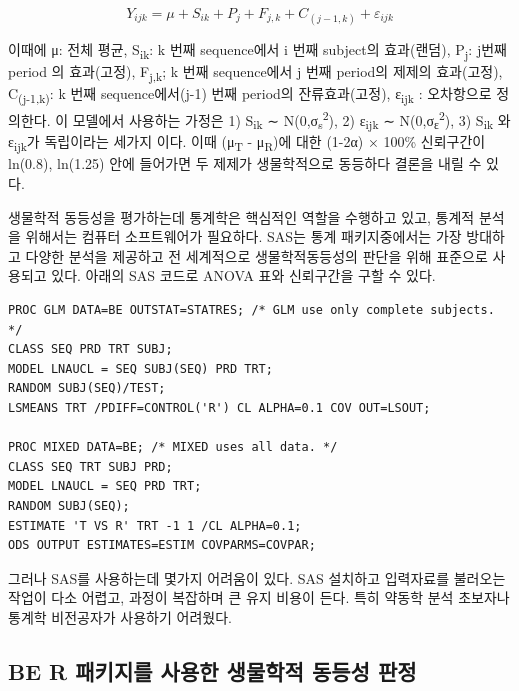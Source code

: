 \documentclass[
  11pt,
  krantz2, a4paper, twoside]{krantz}
\theoremstyle{definition}
\theoremstyle{definition}
\theoremstyle{definition}
\theoremstyle{definition}
\theoremstyle{remark}
\begin{document}
\[
Y_{ijk} = \mu + S_{ik} + P_{j} + F_{j,k} + C_{(j-1,k)} + \varepsilon_{ijk}
\]

이때에 μ: 전체 평균, S\textsubscript{ik}: k 번째 sequence에서 i 번째 subject의 효과(랜덤), P\textsubscript{j}: j번째 period 의 효과(고정), F\textsubscript{j,k}; k 번째 sequence에서 j 번째 period의 제제의 효과(고정), C\textsubscript{(j-1,k)}: k 번째 sequence에서(j-1) 번째 period의 잔류효과(고정), ε\textsubscript{ijk} : 오차항으로 정의한다.
이 모델에서 사용하는 가정은 1) S\textsubscript{ik} ∼ N(0,σ\textsubscript{s}\textsuperscript{2}), 2) ε\textsubscript{ijk} ∼ N(0,σ\textsubscript{ε}\textsuperscript{2}), 3) S\textsubscript{ik} 와 ε\textsubscript{ijk}가 독립이라는 세가지 이다. 이때 (μ\textsubscript{T} - μ\textsubscript{R})에 대한 (1-2α) × 100\% 신뢰구간이 ln(0.8), ln(1.25) 안에 들어가면 두 제제가 생물학적으로 동등하다 결론을 내릴 수 있다.

생물학적 동등성을 평가하는데 통계학은 핵심적인 역할을 수행하고 있고, 통계적 분석을 위해서는 컴퓨터 소프트웨어가 필요하다. SAS는 통계 패키지중에서는 가장 방대하고 다양한 분석을 제공하고 전 세계적으로 생물학적동등성의 판단을 위해 표준으로 사용되고 있다. 아래의 SAS 코드로 ANOVA 표와 신뢰구간을 구할 수 있다.

\begin{verbatim}
PROC GLM DATA=BE OUTSTAT=STATRES; /* GLM use only complete subjects. */
CLASS SEQ PRD TRT SUBJ;
MODEL LNAUCL = SEQ SUBJ(SEQ) PRD TRT;
RANDOM SUBJ(SEQ)/TEST;
LSMEANS TRT /PDIFF=CONTROL('R') CL ALPHA=0.1 COV OUT=LSOUT;

PROC MIXED DATA=BE; /* MIXED uses all data. */
CLASS SEQ TRT SUBJ PRD;
MODEL LNAUCL = SEQ PRD TRT;
RANDOM SUBJ(SEQ);
ESTIMATE 'T VS R' TRT -1 1 /CL ALPHA=0.1;
ODS OUTPUT ESTIMATES=ESTIM COVPARMS=COVPAR;
\end{verbatim}

그러나 SAS를 사용하는데 몇가지 어려움이 있다. SAS 설치하고 입력자료를 불러오는 작업이 다소 어렵고, 과정이 복잡하며 큰 유지 비용이 든다. 특히 약동학 분석 초보자나 통계학 비전공자가 사용하기 어려웠다. 

\hypertarget{be-r-uxd328uxd0a4uxc9c0uxb97c-uxc0acuxc6a9uxd55c-uxc0dduxbb3cuxd559uxc801-uxb3d9uxb4f1uxc131-uxd310uxc815}{%
\subsection{\texorpdfstring{BE R 패키지를 사용한 생물학적 동등성 판정}{BE R 패키지를 사용한 생물학적 동등성 판정}}\label{be-r-uxd328uxd0a4uxc9c0uxb97c-uxc0acuxc6a9uxd55c-uxc0dduxbb3cuxd559uxc801-uxb3d9uxb4f1uxc131-uxd310uxc815}}
\end{document}
